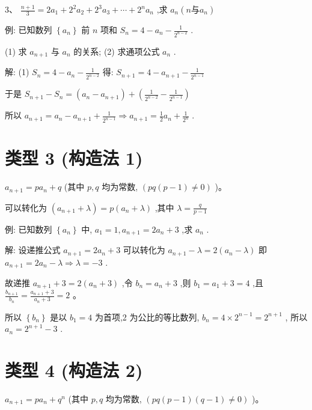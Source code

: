 \documentclass[10pt,cn]{elegantbook}
\begin{document}
3、 \(\frac{n + 1}{3} = 2{a}_{1} + {2}^{2}{a}_{2} + {2}^{3}{a}_{3} + \cdots + {2}^{n}{a}_{n}\) ,求 \({a}_{n}\left( {n\text{与}{a}_{n}}\right)\)

例: 已知数列 \(\left\{ {a}_{n}\right\}\) 前 \(n\) 项和 \({S}_{n} = 4 - {a}_{n} - \frac{1}{{2}^{n - 2}}\) .

(1) 求 \({a}_{n + 1}\) 与 \({a}_{n}\) 的关系; (2) 求通项公式 \({a}_{n}\) .

解: (1) \({S}_{n} = 4 - {a}_{n} - \frac{1}{{2}^{n - 2}}\) 得: \({S}_{n + 1} = 4 - {a}_{n + 1} - \frac{1}{{2}^{n - 1}}\)

于是 \({S}_{n + 1} - {S}_{n} = \left( {{a}_{n} - {a}_{n + 1}}\right) + \left( {\frac{1}{{2}^{n - 2}} - \frac{1}{{2}^{n - 1}}}\right)\)

所以 \({a}_{n + 1} = {a}_{n} - {a}_{n + 1} + \frac{1}{{2}^{n - 1}} \Rightarrow {a}_{n + 1} = \frac{1}{2}{a}_{n} + \frac{1}{{2}^{n}}\) .

\section{类型 3 (构造法 1)} \({a}_{n + 1} = p{a}_{n} + q\) (其中 \(p,q\) 均为常数, \(\left( {{pq}\left( {p - 1}\right) \neq 0}\right)\) )。

可以转化为 \(\left( {{a}_{n + 1} + \lambda }\right) = p\left( {{a}_{n} + \lambda }\right)\) ,其中 \(\lambda = \frac{q}{p - 1}\)

例: 已知数列 \(\left\{ {a}_{n}\right\}\) 中, \({a}_{1} = 1,{a}_{n + 1} = 2{a}_{n} + 3\) ,求 \({a}_{n}\) .

解: 设递推公式 \({a}_{n + 1} = 2{a}_{n} + 3\) 可以转化为 \({a}_{n + 1} - \lambda = 2\left( {{a}_{n} - \lambda }\right)\) 即 \({a}_{n + 1} = 2{a}_{n} - \lambda \Rightarrow \lambda = - 3\) .

故递推 \({a}_{n + 1} + 3 = 2\left( {{a}_{n} + 3}\right)\) ,令 \({b}_{n} = {a}_{n} + 3\) ,则 \({b}_{1} = {a}_{1} + 3 = 4\) ,且 \(\frac{{b}_{n + 1}}{{b}_{n}} = \frac{{a}_{n + 1} + 3}{{a}_{n} + 3} = 2\) 。

所以 \(\left\{ {b}_{n}\right\}\) 是以 \({b}_{1} = 4\) 为首项,2 为公比的等比数列, \({b}_{n} = 4 \times {2}^{n - 1} = {2}^{n + 1}\) , 所以 \({a}_{n} = {2}^{n + 1} - 3\) .

\section{类型 4 (构造法 2)} \({a}_{n + 1} = p{a}_{n} + {q}^{n}\) (其中 \(p,q\) 均为常数, \(\left( {{pq}\left( {p - 1}\right) \left( {q - 1}\right) \neq 0}\right)\) )。
\end{document}
